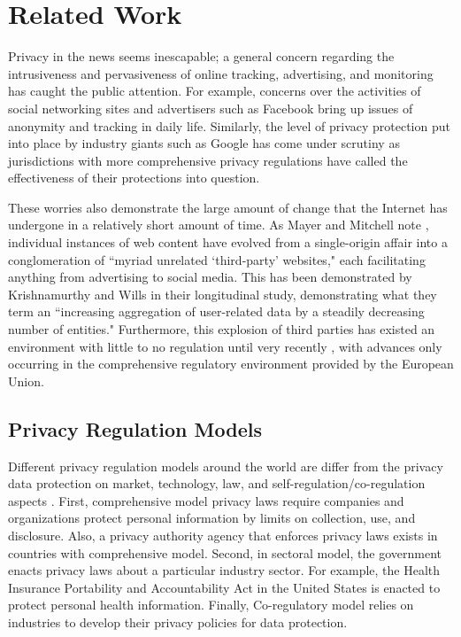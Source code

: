 \documentclass[conference]{IEEEtran}
\begin{document}
\section{Related Work}
Privacy in the news seems inescapable; a general concern regarding the intrusiveness and pervasiveness of online tracking, advertising, and monitoring has caught the public attention. For example, concerns over the activities of social networking sites and advertisers such as Facebook \cite{wsj_fb} bring up issues of anonymity and tracking in daily life. Similarly, the level of privacy protection put into place by industry giants such as Google has come under scrutiny \cite{Google_EU_marketingland} as jurisdictions with more comprehensive privacy regulations have called the effectiveness of their protections into question.

These worries also demonstrate the large amount of change that the Internet has undergone in a relatively short amount of time. As Mayer and Mitchell note \cite{Mayer_Mitchell}, individual instances of web content have evolved from a single-origin affair into a conglomeration of  ``myriad unrelated  `third-party' websites," each facilitating anything from advertising to social media. 
This has been demonstrated by Krishnamurthy and Wills \cite{Krishnamurthy} in their longitudinal study, demonstrating what they term an ``increasing aggregation of user-related data by a steadily decreasing number of entities."
Furthermore, this explosion of third parties has existed an environment with little to no regulation until very recently \cite{Mayer_Mitchell}, with advances only occurring in the comprehensive regulatory environment provided by the European Union.  

\subsection{Privacy Regulation Models}
Different privacy regulation models around the world are differ from the privacy data protection on market, technology, law, and self-regulation/co-regulation aspects \cite{IAPPbook}. First, comprehensive model privacy laws require companies and organizations protect personal information by limits on collection, use, and disclosure. Also, a privacy authority agency that enforces privacy laws exists in countries with comprehensive model. Second, in sectoral model, the government enacts privacy laws about a particular industry sector. For example, the Health Insurance Portability and Accountability Act in the United States is enacted to protect personal health information. Finally, Co-regulatory model relies on industries to develop their privacy policies for data protection.
\end{document}
